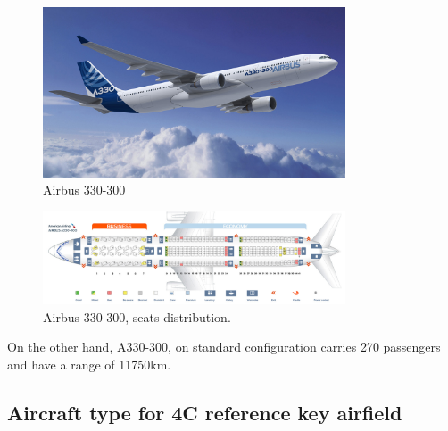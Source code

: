 	\begin{figure}[H]
		\centering
		\includegraphics[clip, trim=0cm 0cm 0cm 0cm, width=0.8\textwidth]{./images/PROGNOSIS/aircraft/a330}
		\caption{Airbus 330-300}
		\label{a330}
	\end{figure}
	\begin{figure}[H]
		\centering
		\includegraphics[clip, trim=0cm 0cm 0cm 0cm, width=0.8\textwidth]{./images/PROGNOSIS/aircraft/a330seats}
		\caption{Airbus 330-300, seats distribution.}
		\label{a330seats}
	\end{figure}

	On the other hand, A330-300, on standard configuration carries 270 passengers and have a range of 11750km.
	
	\subsection{Aircraft type for 4C reference key airfield}
